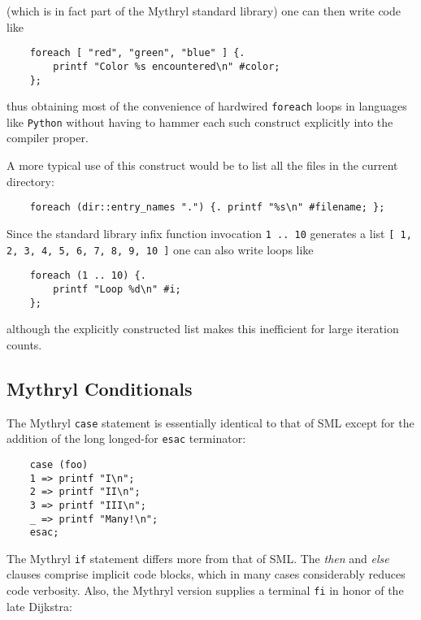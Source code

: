 (which is in fact part of the Mythryl standard library) one can then write 
code like

\begin{verbatim}
    foreach [ "red", "green", "blue" ] {.
        printf "Color %s encountered\n" #color;
    };
\end{verbatim}

thus obtaining most of the convenience of hardwired {\tt foreach} loops 
in languages like {\tt Python} without having to hammer each such construct 
explicitly into the compiler proper.

A more typical use of this construct would be to list all the files in 
the current directory:

\begin{verbatim}
    foreach (dir::entry_names ".") {. printf "%s\n" #filename; };
\end{verbatim}


Since the standard library infix function invocation {\tt 1 .. 10} generates 
a list {\tt [ 1, 2, 3, 4, 5, 6, 7, 8, 9, 10 ]} one can also write loops like 

\begin{verbatim}
    foreach (1 .. 10) {.
        printf "Loop %d\n" #i;
    };
\end{verbatim}

although the explicitly constructed list makes this inefficient for large 
iteration counts.

\cutend*

\subsection{Mythryl Conditionals}

The Mythryl {\tt case} statement is essentially identical to that of SML 
except for the addition of the long longed-for {\tt esac} terminator:

\begin{verbatim}
    case (foo)
    1 => printf "I\n";
    2 => printf "II\n";
    3 => printf "III\n";
    _ => printf "Many!\n";
    esac;
\end{verbatim}

The Mythryl {\tt if} statement differs more from that of SML. 
The {\it then} and {\it else} clauses comprise implicit code 
blocks, which in many cases considerably reduces code verbosity. 
Also, the Mythryl version supplies a terminal {\tt fi} in honor 
of the late Dijkstra:

